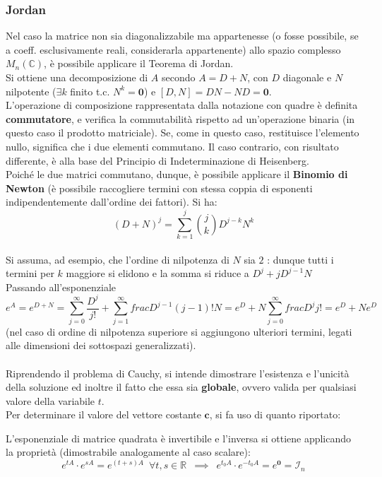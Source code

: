 \documentclass[10pt]{article}
\theoremstyle{plain}
\begin{document}
\subsubsection{Jordan}
Nel caso la matrice non sia diagonalizzabile ma appartenesse (o fosse possibile, se a coeff. esclusivamente reali, considerarla appartenente) allo spazio complesso $M_n(\mathbb{C})$, è possibile applicare il Teorema di Jordan.
\\Si ottiene una decomposizione di $A$ secondo $A = D + N$, con $D$ diagonale e $N$ nilpotente ($\exists k$ finito t.c. $N^k = \mathbf{0}$) e $[D, N] = DN - ND = \mathbf{0}$. 
\\L'operazione di composizione rappresentata dalla notazione con quadre è definita \textbf{commutatore}, e verifica la commutabilità rispetto ad un'operazione binaria (in questo caso il prodotto matriciale). Se, come in questo caso, restituisce l'elemento nullo, significa che i due elementi commutano. Il caso contrario, con risultato differente, è alla base del Principio di Indeterminazione di Heisenberg.
\\Poiché le due matrici commutano, dunque, è possibile applicare il \textbf{Binomio di Newton} (è possibile raccogliere termini con stessa coppia di esponenti indipendentemente dall'ordine dei fattori). Si ha:
\[(D + N)^j = \sum\limits_{k=1}^j \binom{j}{k}D^{j - k}N^k\]
\\Si assuma, ad esempio, che l'ordine di nilpotenza di $N$ sia $2$ : dunque tutti i termini per $k$ maggiore si elidono e la somma si riduce a $D^j + j D^{j-1}N$
\\Passando all'esponenziale
\[e^A = e^{D+N} = \sum\limits_{j=0}^\infty \frac{D^j}{j!} + \sum\limits_{j = 1}^\infty frac{D^{j-1}}{(j-1)!}N = e^D + N \sum\limits_{j=0}^\infty frac{D^j}{j!} = e^D + N e^D\]
(nel caso di ordine di nilpotenza superiore si aggiungono ulteriori termini, legati alle dimensioni dei sottospazi generalizzati).
\\~\\Riprendendo il problema di Cauchy, si intende dimostrare l'esistenza e l'unicità della soluzione ed inoltre il fatto che essa sia \textbf{globale}, ovvero valida per qualsiasi valore della variabile $t$.
\\Per determinare il valore del vettore costante $\mathbf{c}$, si fa uso di quanto riportato:
\begin{oss}
L'esponenziale di matrice quadrata è invertibile e l'inversa si ottiene applicando la proprietà (dimostrabile analogamente al caso scalare):
\[e^{tA} \cdot e^{sA} = e^{(t+s)A} \enspace \forall t,s \in \mathbb{R} \enspace \implies \enspace e^{t_0 A} \cdot e^{- t_0 A} = e^{\mathbf{0}} = \mathcal{I}_n\]
\end{oss}
\end{document}
